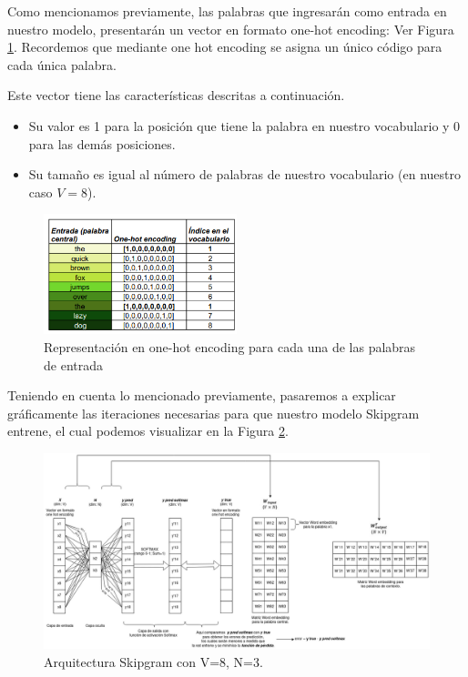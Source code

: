 \documentclass[12pt,a4paper]{article}
\begin{document}
\begin{sloppypar}
\cleardoublepage

Como mencionamos previamente, las palabras que ingresarán como entrada en nuestro modelo, presentarán un vector en formato one-hot encoding: Ver Figura \ref{fig:3_EjSkip}. Recordemos que mediante one hot encoding se asigna un único código para cada única palabra. 

Este vector tiene las características descritas a continuación.
\begin{itemize}
\item Su valor es 1 para la posición que tiene la palabra en nuestro vocabulario y 0 para las demás posiciones.
\item Su tamaño es igual al número de palabras de nuestro vocabulario (en nuestro caso $V = 8$). 
\end{itemize}

\begin{figure}[H]    %
\centering
\includegraphics[width=0.5\textwidth]{images/Ejemplo_Skipgram/3_EjSkip.png}
 \captionsetup{justification=centering,margin=3cm}
\caption{Representación en one-hot encoding para cada una de las palabras de entrada} 
\label{fig:3_EjSkip}
\end{figure}

Teniendo en cuenta lo mencionado previamente, pasaremos a explicar gráficamente las iteraciones necesarias para que nuestro modelo Skipgram entrene, el cual podemos visualizar en la  Figura \ref{fig:4_EjSkip}.

\begin{figure}[H]    %
\centering
\includegraphics[width=1\textwidth]{images/Ejemplo_Skipgram/4_EjSkip.png}
\caption{Arquitectura Skipgram con V=8, N=3.} 
\label{fig:4_EjSkip}
\end{figure}


\end{sloppypar}
\end{document}
